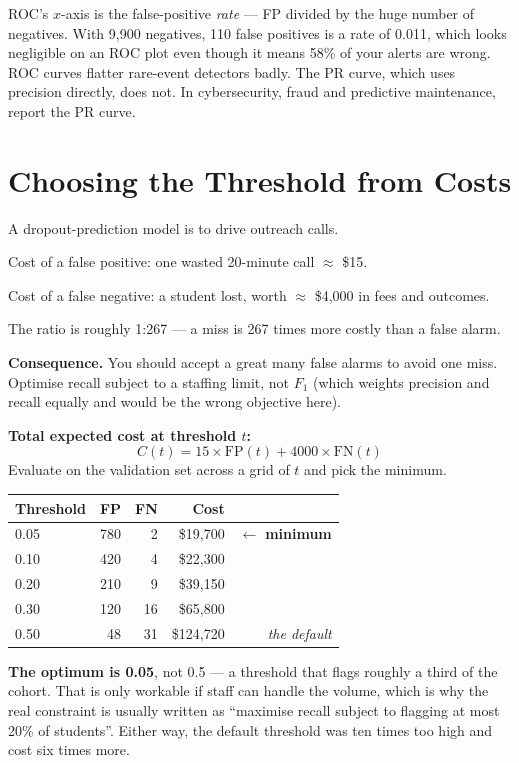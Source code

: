 \begin{alertbox}
ROC's $x$-axis is the false-positive \emph{rate} --- FP divided by the huge number
of negatives. With 9{,}900 negatives, 110 false positives is a rate of 0.011, which
looks negligible on an ROC plot even though it means 58\% of your alerts are wrong.
ROC curves flatter rare-event detectors badly. The PR curve, which uses precision
directly, does not. In cybersecurity, fraud and predictive maintenance, report the
PR curve.
\end{alertbox}

\section{Choosing the Threshold from Costs}

\begin{worked}
A dropout-prediction model is to drive outreach calls.
\begin{tight}
  \item Cost of a false positive: one wasted 20-minute call $\approx$ \$15.
  \item Cost of a false negative: a student lost, worth $\approx$ \$4{,}000 in fees
        and outcomes.
\end{tight}
The ratio is roughly 1:267 --- a miss is 267 times more costly than a false alarm.

\smallskip
\textbf{Consequence.} You should accept a great many false alarms to avoid one
miss. Optimise recall subject to a staffing limit, not $F_1$ (which weights
precision and recall equally and would be the wrong objective here).

\textbf{Total expected cost at threshold $t$:}
\[
C(t) = 15 \times \text{FP}(t) + 4000 \times \text{FN}(t)
\]
Evaluate on the validation set across a grid of $t$ and pick the minimum.

\smallskip
\begin{center}
\begin{tabular}{@{}lrrrr@{}}
\toprule
\textbf{Threshold} & \textbf{FP} & \textbf{FN} & \textbf{Cost} & \\
\midrule
0.05 & 780 & \phantom{0}2 & \$19{,}700 & $\leftarrow$ \textbf{minimum} \\
0.10 & 420 & \phantom{0}4 & \$22{,}300 & \\
0.20 & 210 & \phantom{0}9 & \$39{,}150 & \\
0.30 & 120 & 16 & \$65{,}800 & \\
0.50 & \phantom{0}48 & 31 & \$124{,}720 & \emph{the default} \\
\bottomrule
\end{tabular}
\end{center}

\smallskip
\textbf{The optimum is 0.05}, not 0.5 --- a threshold that flags roughly a third of
the cohort. That is only workable if staff can handle the volume, which is why the
real constraint is usually written as ``maximise recall subject to flagging at most
20\% of students''. Either way, the default threshold was ten times too high and
cost six times more.
\end{worked}

